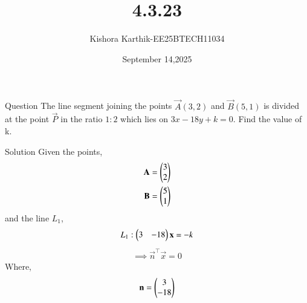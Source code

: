\documentclass{beamer}
\begin{document}
\title 
{4.3.23}
\date{September 14,2025}


\author 
{Kishora Karthik-EE25BTECH11034}
\frame{\titlepage}
\begin{frame}{Question}
The line segment joining the points $\vec{A}(3,2)$ and $\vec{B}(5,1)$ is divided at the point $\vec{P}$ in the ratio $1:2$ which lies on $3x - 18y+k=0$. Find the value of k.\\
\end{frame}

\begin{frame}{ Solution}
Given the points,
\begin{align}
    \vec{A}=\begin{myvec}{3\\2}\end{myvec}\\ 
    \vec{B}=\begin{myvec}{5\\1}\end{myvec}
\end{align}
and the line $L_1$,
\begin{align}
    L_1: \begin{pmatrix}3 & -18\end{pmatrix}\mathbf{x} = -k
\end{align}
\begin{align}
    \implies \vec{n}^{\top}\vec{x}=0
\end{align}
Where,
\begin{align}
     \mathbf{n}=\begin{pmatrix}3\\-18\end{pmatrix}
\end{align}
\end{frame}
\end{document}
